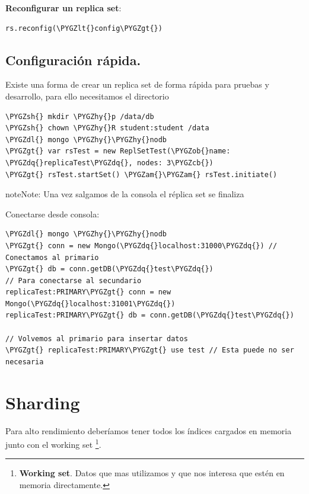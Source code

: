 \documentclass[a4paper,10pt,english]{sphinxmanual}
\def\PYGZob{\char`\{}
\def\PYGZcb{\char`\}}
\def\PYGZam{\char`\&}
\def\PYGZlt{\char`\<}
\def\PYGZgt{\char`\>}
\def\PYGZsh{\char`\#}
\def\PYGZdl{\char`\$}
\def\PYGZhy{\char`\-}
\def\PYGZdq{\char`\"}
\begin{document}
\textbf{Reconfigurar un replica set}:

\begin{Verbatim}[commandchars=\\\{\}]
rs.reconfig(\PYGZlt{}config\PYGZgt{})
\end{Verbatim}


\section{Configuración rápida.}
\label{contents/replicaSet:configuracion-rapida}
Existe una forma de crear un replica set de forma rápida para pruebas y desarrollo, para ello necesitamos el directorio 

\begin{Verbatim}[commandchars=\\\{\}]
\PYGZsh{} mkdir \PYGZhy{}p /data/db
\PYGZsh{} chown \PYGZhy{}R student:student /data
\PYGZdl{} mongo \PYGZhy{}\PYGZhy{}nodb
\PYGZgt{} var rsTest = new ReplSetTest(\PYGZob{}name: \PYGZdq{}replicaTest\PYGZdq{}, nodes: 3\PYGZcb{})
\PYGZgt{} rsTest.startSet() \PYGZam{}\PYGZam{} rsTest.initiate()
\end{Verbatim}

\begin{notice}{note}{Note:}
Una vez salgamos de la consola el réplica set se finaliza
\end{notice}

Conectarse desde consola:

\begin{Verbatim}[commandchars=\\\{\}]
\PYGZdl{} mongo \PYGZhy{}\PYGZhy{}nodb
\PYGZgt{} conn = new Mongo(\PYGZdq{}localhost:31000\PYGZdq{}) // Conectamos al primario
\PYGZgt{} db = conn.getDB(\PYGZdq{}test\PYGZdq{})
// Para conectarse al secundario
replicaTest:PRIMARY\PYGZgt{} conn = new Mongo(\PYGZdq{}localhost:31001\PYGZdq{})
replicaTest:PRIMARY\PYGZgt{} db = conn.getDB(\PYGZdq{}test\PYGZdq{})

// Volvemos al primario para insertar datos
\PYGZgt{} replicaTest:PRIMARY\PYGZgt{} use test // Esta puede no ser necesaria
\end{Verbatim}


\chapter{Sharding}
\label{contents/sharding::doc}\label{contents/sharding:sharding}
Para alto rendimiento deberíamos tener todos los índices cargados en memoria junto con el working set \footnote{
\textbf{Working set}. Datos que mas utilizamos y que nos interesa que estén en memoria directamente.
}.
\end{document}
